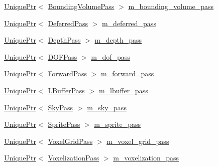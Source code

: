 \begin{DoxyCompactItemize}
\item 
\hyperlink{namespacemage_a3316d7143a973e37adf1110f2e80ca31}{Unique\+Ptr}$<$ \hyperlink{classmage_1_1rendering_1_1_bounding_volume_pass}{Bounding\+Volume\+Pass} $>$ \hyperlink{classmage_1_1rendering_1_1_renderer_1_1_impl_adeb573b3a2780e7c8af6fda3e073f90b}{m\+\_\+bounding\+\_\+volume\+\_\+pass}
\item 
\hyperlink{namespacemage_a3316d7143a973e37adf1110f2e80ca31}{Unique\+Ptr}$<$ \hyperlink{classmage_1_1rendering_1_1_deferred_pass}{Deferred\+Pass} $>$ \hyperlink{classmage_1_1rendering_1_1_renderer_1_1_impl_acab2b5fe9403dd1a7643ae91e8a0433d}{m\+\_\+deferred\+\_\+pass}
\item 
\hyperlink{namespacemage_a3316d7143a973e37adf1110f2e80ca31}{Unique\+Ptr}$<$ \hyperlink{classmage_1_1rendering_1_1_depth_pass}{Depth\+Pass} $>$ \hyperlink{classmage_1_1rendering_1_1_renderer_1_1_impl_a6774962f06bc28a23ac7e34d8891bb24}{m\+\_\+depth\+\_\+pass}
\item 
\hyperlink{namespacemage_a3316d7143a973e37adf1110f2e80ca31}{Unique\+Ptr}$<$ \hyperlink{classmage_1_1rendering_1_1_d_o_f_pass}{D\+O\+F\+Pass} $>$ \hyperlink{classmage_1_1rendering_1_1_renderer_1_1_impl_a6ac5ccc13646575c8feeeb2974f21dc3}{m\+\_\+dof\+\_\+pass}
\item 
\hyperlink{namespacemage_a3316d7143a973e37adf1110f2e80ca31}{Unique\+Ptr}$<$ \hyperlink{classmage_1_1rendering_1_1_forward_pass}{Forward\+Pass} $>$ \hyperlink{classmage_1_1rendering_1_1_renderer_1_1_impl_aa62d3e015ddcc7b48d423ad0e55a82d7}{m\+\_\+forward\+\_\+pass}
\item 
\hyperlink{namespacemage_a3316d7143a973e37adf1110f2e80ca31}{Unique\+Ptr}$<$ \hyperlink{classmage_1_1rendering_1_1_l_buffer_pass}{L\+Buffer\+Pass} $>$ \hyperlink{classmage_1_1rendering_1_1_renderer_1_1_impl_a82455409a99a11e84de943181138e33e}{m\+\_\+lbuffer\+\_\+pass}
\item 
\hyperlink{namespacemage_a3316d7143a973e37adf1110f2e80ca31}{Unique\+Ptr}$<$ \hyperlink{classmage_1_1rendering_1_1_sky_pass}{Sky\+Pass} $>$ \hyperlink{classmage_1_1rendering_1_1_renderer_1_1_impl_afc248fa0b293e9cbd2d0045c4caa7d26}{m\+\_\+sky\+\_\+pass}
\item 
\hyperlink{namespacemage_a3316d7143a973e37adf1110f2e80ca31}{Unique\+Ptr}$<$ \hyperlink{classmage_1_1rendering_1_1_sprite_pass}{Sprite\+Pass} $>$ \hyperlink{classmage_1_1rendering_1_1_renderer_1_1_impl_a38a33ead382177e950db18795601723a}{m\+\_\+sprite\+\_\+pass}
\item 
\hyperlink{namespacemage_a3316d7143a973e37adf1110f2e80ca31}{Unique\+Ptr}$<$ \hyperlink{classmage_1_1rendering_1_1_voxel_grid_pass}{Voxel\+Grid\+Pass} $>$ \hyperlink{classmage_1_1rendering_1_1_renderer_1_1_impl_ad0b4ff740d36e1723949213ab5ba74bc}{m\+\_\+voxel\+\_\+grid\+\_\+pass}
\item 
\hyperlink{namespacemage_a3316d7143a973e37adf1110f2e80ca31}{Unique\+Ptr}$<$ \hyperlink{classmage_1_1rendering_1_1_voxelization_pass}{Voxelization\+Pass} $>$ \hyperlink{classmage_1_1rendering_1_1_renderer_1_1_impl_a1701b11fe9fe100a033920b6e8617adb}{m\+\_\+voxelization\+\_\+pass}
\end{DoxyCompactItemize}


